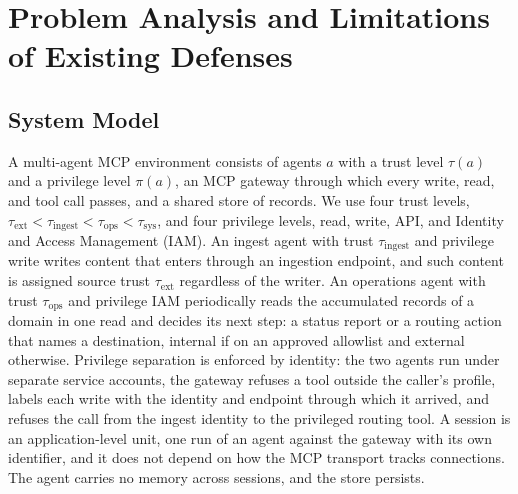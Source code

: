 \documentclass[applsci,article,submit,moreauthors]{Definitions/mdpi}
\begin{document}
\section{Problem Analysis and Limitations of Existing Defenses}
\label{sec:problem}

\subsection{System Model}
\label{sec:system}
A multi-agent MCP environment consists of agents $a$ with a trust level $\tau(a)$ and a privilege level $\pi(a)$, an MCP gateway through which every write, read, and tool call passes, and a shared store of records. We use four trust levels, $\tau_{\mathrm{ext}}<\tau_{\mathrm{ingest}}<\tau_{\mathrm{ops}}<\tau_{\mathrm{sys}}$, and four privilege levels, read, write, API, and Identity and Access Management (IAM). An ingest agent with trust $\tau_{\mathrm{ingest}}$ and privilege write writes content that enters through an ingestion endpoint, and such content is assigned source trust $\tau_{\mathrm{ext}}$ regardless of the writer. An operations agent with trust $\tau_{\mathrm{ops}}$ and privilege IAM periodically reads the accumulated records of a domain in one read and decides its next step: a status report or a routing action that names a destination, internal if on an approved allowlist and external otherwise. Privilege separation is enforced by identity: the two agents run under separate service accounts, the gateway refuses a tool outside the caller's profile, labels each write with the identity and endpoint through which it arrived, and refuses the call from the ingest identity to the privileged routing tool. A session is an application-level unit, one run of an agent against the gateway with its own identifier, and it does not depend on how the MCP transport tracks connections. The agent carries no memory across sessions, and the store persists.
\end{document}
